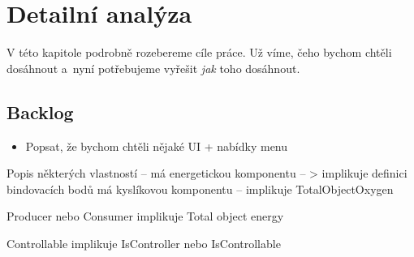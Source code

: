 
\chapter{Detailní analýza}

V této kapitole podrobně rozebereme cíle práce. Už víme, čeho bychom chtěli dosáhnout a~nyní potřebujeme vyřešit \textit{jak} toho dosáhnout.





















\section{Backlog}

\begin{itemize}
	
	\item Popsat, že bychom chtěli nějaké UI + nabídky menu

\end{itemize}



Popis některých vlastností -- má energetickou komponentu -- > implikuje definici bindovacích bodů
má kyslíkovou komponentu -- implikuje TotalObjectOxygen

Producer nebo Consumer implikuje Total object energy

Controllable implikuje IsController nebo IsControllable
